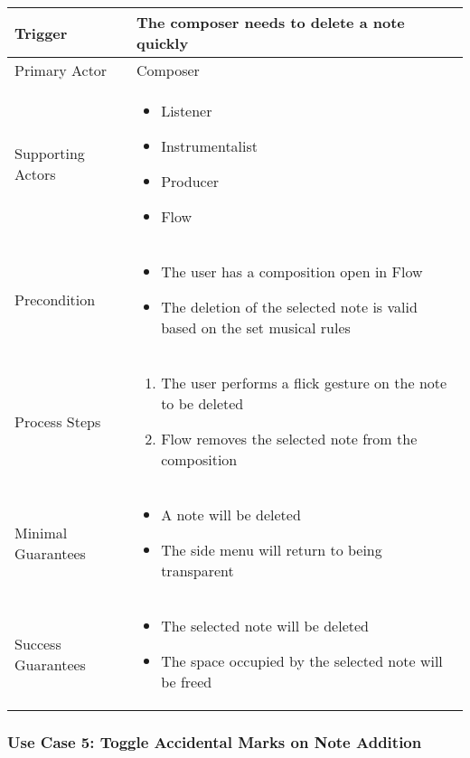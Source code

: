   \begin{tabularx}{\textwidth}{|X|X|}
  \hline
  Trigger & 
  The composer needs to delete a note quickly \\
  \hline
  Primary Actor & 
  Composer\\
  \hline
  Supporting Actors & 
  \begin{itemize}
  \item Listener
  \item Instrumentalist
  \item Producer
  \item Flow
  \end{itemize} \\
  \hline
  Precondition & 
  \begin{itemize}
  \item The user has a composition open in Flow 
  \item The deletion of the selected note is valid based on the set musical rules
  \end{itemize} \\
  \hline
  Process Steps & 
  \begin{enumerate}
  \item The user performs a flick gesture on the note to be deleted
  \item Flow removes the selected note from the composition
  \end{enumerate} \\
  \hline
  Minimal Guarantees & 
  \begin{itemize}
    \item A note will be deleted
    \item The side menu will return to being transparent
  \end{itemize} \\
  \hline
  Success Guarantees & 
  \begin{itemize}
    \item The selected note will be deleted
    \item The space occupied by the selected note will be freed
  \end{itemize} \\
  \hline
  \end{tabularx}

  \subsubsection{Use Case 5: Toggle Accidental Marks on Note Addition}


